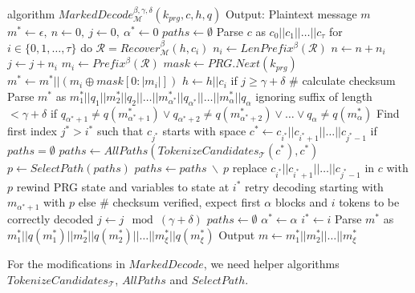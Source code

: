 \begin{Pseudocode}[caption={
$MarkedDecode$ algorithm.
In comparison to Meteor's $Decode$ algorithm, $MarkedDecode$ verifies the checksums $q(m_i)$ of blocks $m_i$.
If the checksum does not match, a decoding error occured.
It then performs a lookbehind on the stegotext and generates all possible tokenizations $paths$ for a substring of $c$.
Afterwards, rewind the internal state and retry decoding with a path $p$ selected from $paths$.
}, label={alg:marked-decode}]
algorithm $MarkedDecode_{\mathcal{M}}^{\beta,\gamma,\delta}(k_{prg}, c, h, q)$
  Output: Plaintext message $m$
  $m^* \leftarrow \epsilon,~ n \leftarrow 0,~ j \leftarrow 0,~ \alpha^* \leftarrow 0$
  $paths \leftarrow \emptyset$
  Parse $c$ as $c_0 || c_1 || \dots || c_{\tau}$
  for $i \in \{ 0, 1, \dots, \tau \}$ do
    $\mathcal{R} = Recover_{\mathcal{M}}^\beta(h, c_i)$
    $n_i \leftarrow LenPrefix^\beta(\mathcal{R})$
    $n \leftarrow n + n_i$
    $j \leftarrow j + n_i$
    $m_i \leftarrow Prefix^\beta(\mathcal{R})$
    $mask \leftarrow PRG.Next(k_{prg})$
    $m^* \leftarrow m^* || (m_i \oplus mask[0: |m_i|])$
    $h \leftarrow h||c_i$
    if $j \geq \gamma + \delta$
      # calculate checksum
      Parse $m^*$ as $m^*_1||q_1||m^*_2||q_2||\dots||m^*_{\alpha^*}||q_{\alpha^*}||\dots||m^*_\alpha||q_\alpha$ ignoring suffix of length $< \gamma+\delta$
      if $q_{\alpha^*+1} \neq q(m^*_{\alpha^*+1}) \lor q_{\alpha^*+2} \neq q(m^*_{\alpha^*+2}) \lor \dots \lor q_\alpha \neq q(m^*_\alpha)$
        Find first index $j^* > i^*$ such that $c_{j^*}$ starts with space
        $c^* \leftarrow c_{i^*} || c_{i^*+1} || \dots || c_{j^*-1}$
        if $paths = \emptyset$
          $paths \leftarrow AllPaths(TokenizeCandidates_{\mathcal{T}}(c^*), c^*)$
        $p \leftarrow SelectPath(paths)$
        $paths \leftarrow paths~ \backslash~ p$
        replace $c_{i^*}||c_{i^*+1}||\dots||c_{j^*-1}$ in $c$ with $p$
        rewind PRG state and variables to state at $i^*$
        retry decoding starting with $m_{\alpha^*+1}$ with $p$
      else  # checksum verified, expect first $\alpha$ blocks and $i$ tokens to be correctly decoded
        $j \leftarrow j \mod (\gamma+\delta)$
        $paths \leftarrow \emptyset$
        $\alpha^* \leftarrow \alpha$
        $i^* \leftarrow i$
  Parse $m^*$ as $m^*_1||q(m^*_1)||m^*_2||q(m^*_2)||\dots||m^*_\xi||q(m^*_\xi)$
  Output $m \leftarrow m^*_1||m^*_2||\dots||m^*_\xi$
\end{Pseudocode}

For the modifications in $MarkedDecode$, we need helper algorithms $TokenizeCandidates_{\mathcal{T}}$, $AllPaths$ and $SelectPath$.

